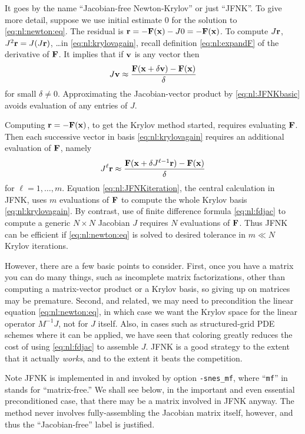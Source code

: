 It goes by the name ``Jacobian-free Newton-Krylov'' \citep{KnollKeyes2004} or just ``JFNK''.  To give more detail, suppose we use initial estimate $0$ for the solution to \eqref{eq:nl:newton:eq}.  The residual is $\mathbf{r} = - \mathbf{F}(\mathbf{x}) - J 0 = - \mathbf{F}(\mathbf{x})$.  To compute $J\mathbf{r}$, $J^2\mathbf{r}=J(J\mathbf{r})$, \dots in \eqref{eq:nl:krylovagain}, recall definition \eqref{eq:nl:expandF} of the derivative of $\mathbf{F}$.  It implies that if $\mathbf{v}$ is any vector then
\begin{equation}
J \mathbf{v} \approx \frac{\mathbf{F}(\mathbf{x}+\delta \mathbf{v}) - \mathbf{F}(\mathbf{x})}{\delta} \label{eq:nl:JFNKbasic}
\end{equation}
for small $\delta \ne 0$.  Approximating the Jacobian-vector product by \eqref{eq:nl:JFNKbasic} avoids evaluation of any entries of $J$.

Computing $\mathbf{r} = - \mathbf{F}(\mathbf{x})$, to get the Krylov method started, requires evaluating $\mathbf{F}$.  Then each successive vector in basis \eqref{eq:nl:krylovagain} requires an additional evaluation of $\mathbf{F}$, namely
\begin{equation}
J^{\ell} \mathbf{r} \approx \frac{\mathbf{F}(\mathbf{x}+\delta J^{\ell-1}\mathbf{r}) - \mathbf{F}(\mathbf{x})}{\delta} \label{eq:nl:JFNKiteration}
\end{equation}
for $\ell=1,\dots,m$.  Equation \eqref{eq:nl:JFNKiteration}, the central calculation in JFNK, uses $m$ evaluations of $\mathbf{F}$ to compute the whole Krylov basis \eqref{eq:nl:krylovagain}.  By contrast, use of finite difference formula \eqref{eq:nl:fdjac} to compute a generic $N\times N$ Jacobian $J$ requires $N$ evaluations of $\mathbf{F}$.  Thus JFNK can be efficient if \eqref{eq:nl:newton:eq} is solved to desired tolerance in $m\ll N$ Krylov iterations.

However, there are a few basic points to consider.  First, once you have a matrix you can do many things, such as incomplete matrix factorizations, other than computing a matrix-vector product or a Krylov basis, so giving up on matrices may be premature.  Second, and related, we may need to precondition the linear equation \eqref{eq:nl:newton:eq}, in which case we want the Krylov space for the linear operator $M^{-1}J$, not for $J$ itself.  Also, in cases such as structured-grid PDE schemes where it can be applied, we have seen that coloring greatly reduces the cost of using \eqref{eq:nl:fdjac} to assemble $J$.  JFNK is a good strategy to the extent that it actually \emph{works}, and to the extent it beats the competition.

Note JFNK is implemented in \PETSc and invoked by option \texttt{-snes\_mf}, where ``\texttt{mf}'' in stands for ``matrix-free.''  We shall see below, in the important and even essential preconditioned case, that there may be a matrix involved in JFNK anyway.  The method never involves fully-assembling the Jacobian matrix itself, however, and thus the ``Jacobian-free'' label is justified.

